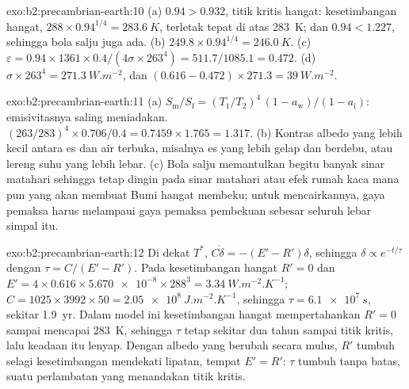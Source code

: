 \begin{solution}{exo:b2:precambrian-earth:10}
(a) $0.94 > 0.932$, titik kritis hangat: kesetimbangan hangat, $288\times0.94^{1/4} =
\qty{283.6}{K}$, terletak tepat di atas \qty{283}{K}; dan $0.94 < 1.227$, sehingga bola salju juga ada.
(b) $249.8\times0.94^{1/4} = \qty{246.0}{K}$. (c) $\varepsilon = 0.94\times1361\times0.4/(4\sigma
\times263^4) = 511.7/1085.1 = 0.472$. (d) $\sigma\times263^4 = \qty{271.3}{W.m^{-2}}$, dan $(0.616
- 0.472)\times271.3 = \qty{39}{W.m^{-2}}$.
\end{solution}

\begin{solution}{exo:b2:precambrian-earth:11}
(a) $S_{\text{m}}/S_{\text{f}} = (T_1/T_2)^4\,(1 - a_{\text{w}})/(1 - a_{\text{i}})$:
emisivitasnya saling meniadakan. $(263/283)^4\times0.706/0.4 = 0.7459\times1.765 = 1.317$. (b) Kontras
albedo yang lebih kecil antara es dan air terbuka, misalnya es yang lebih gelap dan berdebu, atau lereng
suhu yang lebih lebar. (c) Bola salju memantulkan begitu banyak sinar matahari sehingga tetap dingin pada sinar matahari atau
efek rumah kaca mana pun yang akan membuat Bumi hangat membeku; untuk mencairkannya, gaya pemaksa harus melampaui gaya pemaksa
pembekuan sebesar seluruh lebar simpal itu.
\end{solution}

\begin{solution}{exo:b2:precambrian-earth:12}
Di dekat $T^*$, $C\dot\delta = -(E' - R')\delta$, sehingga $\delta \propto e^{-t/\tau}$ dengan $\tau =
C/(E' - R')$. Pada kesetimbangan hangat $R' = 0$ dan $E' = 4\times0.616\times\num{5.670e-8}\times
288^3 = \qty{3.34}{W.m^{-2}.K^{-1}}$; $C = 1025\times3992\times50 = \qty{2.05e8}{J.m^{-2}.K^{-1}}$,
sehingga $\tau = \qty{6.1e7}{s}$, sekitar \qty{1.9}{yr}. Dalam model ini kesetimbangan hangat mempertahankan $R' =
0$ sampai mencapai \qty{283}{K}, sehingga $\tau$ tetap sekitar dua tahun sampai titik kritis, lalu
keadaan itu lenyap. Dengan albedo yang berubah secara mulus, $R'$ tumbuh selagi kesetimbangan mendekati
lipatan, tempat $E' = R'$: $\tau$ tumbuh tanpa batas, suatu perlambatan yang menandakan titik
kritis.
\end{solution}


